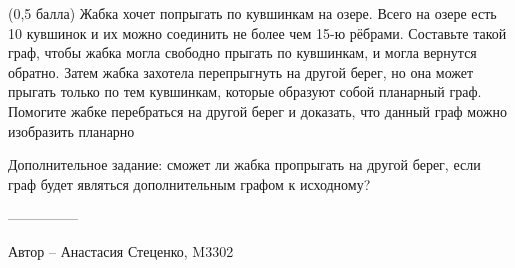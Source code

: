 \question
(0,5 балла) Жабка хочет попрыгать по кувшинкам на озере. Всего на озере есть 10 кувшинок и их можно соединить не более чем 15-ю рёбрами. Составьте такой граф, чтобы жабка могла свободно прыгать по кувшинкам, и могла вернутся обратно. Затем жабка захотела перепрыгнуть на другой берег, но она может прыгать только по тем кувшинкам, которые образуют собой планарный граф. Помогите жабке перебраться на другой берег и доказать, что данный граф можно изобразить планарно

Дополнительное задание: сможет ли жабка пропрыгать на другой берег, если граф будет являться дополнительным графом к исходному?

---------------

Автор -- Анастасия Стеценко, M3302
